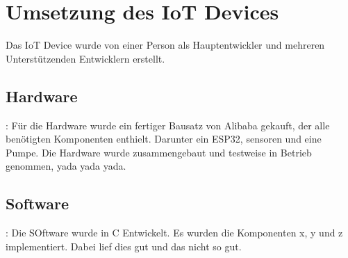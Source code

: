 \section{Umsetzung des IoT Devices}
Das IoT Device wurde von einer Person als Hauptentwickler und mehreren Unterstützenden Entwicklern erstellt.
    \subsection{Hardware}:
    Für die Hardware wurde ein fertiger Bausatz von Alibaba gekauft, der alle benötigten Komponenten enthielt.
    Darunter ein ESP32, sensoren und eine Pumpe.
    Die Hardware wurde zusammengebaut und testweise in Betrieb genommen, yada yada yada.
    \subsection{Software}:
    Die SOftware wurde in C Entwickelt.
    Es wurden die Komponenten x, y und z implementiert.
    Dabei lief dies gut und das nicht so gut.